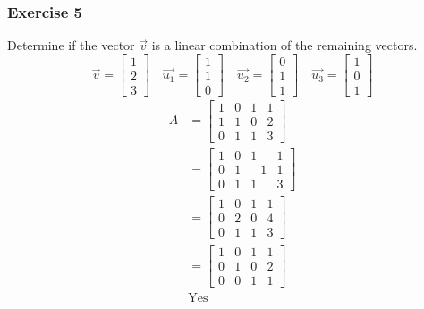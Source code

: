 \documentclass[letterpaper, 12pt]{math}
\begin{document}
\subsubsection*{Exercise 5}
Determine if the vector \( \vec{v} \) is a linear combination of the remaining
vectors.
\[ \vec{v} = \begin{bmatrix}1 \\ 2 \\ 3\end{bmatrix} \quad
  \vec{u_1} = \begin{bmatrix}1 \\ 1 \\ 0\end{bmatrix} \quad
  \vec{u_2} = \begin{bmatrix}0 \\ 1 \\ 1\end{bmatrix} \quad
  \vec{u_3} = \begin{bmatrix}1 \\ 0 \\ 1\end{bmatrix} \]
\begin{align*}
  A &= \begin{bmatrix}
    1 & 0 & 1 & 1 \\
    1 & 1 & 0 & 2 \\
    0 & 1 & 1 & 3
  \end{bmatrix} \\
  &= \begin{bmatrix}
    1 & 0 & 1 & 1 \\
    0 & 1 & -1 & 1 \\
    0 & 1 & 1 & 3
  \end{bmatrix} \\
  &= \begin{bmatrix}
    1 & 0 & 1 & 1 \\
    0 & 2 & 0 & 4 \\
    0 & 1 & 1 & 3
  \end{bmatrix} \\
  &= \begin{bmatrix}
    1 & 0 & 1 & 1 \\
    0 & 1 & 0 & 2 \\
    0 & 0 & 1 & 1
  \end{bmatrix} \\
  & \text{Yes}
\end{align*}
\end{document}
